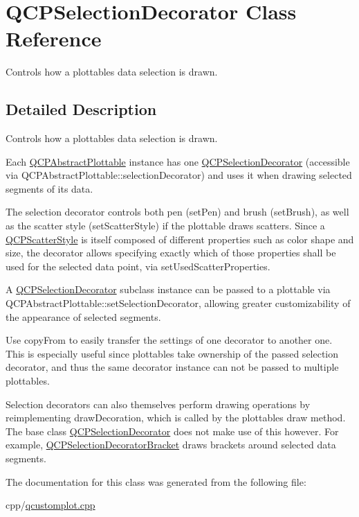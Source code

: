 \hypertarget{class_q_c_p_selection_decorator}{}\section{Q\+C\+P\+Selection\+Decorator Class Reference}
\label{class_q_c_p_selection_decorator}


Controls how a plottable\textquotesingle{}s data selection is drawn.  




\subsection{Detailed Description}
Controls how a plottable\textquotesingle{}s data selection is drawn. 

Each \mbox{\hyperlink{class_q_c_p_abstract_plottable}{Q\+C\+P\+Abstract\+Plottable}} instance has one \mbox{\hyperlink{class_q_c_p_selection_decorator}{Q\+C\+P\+Selection\+Decorator}} (accessible via Q\+C\+P\+Abstract\+Plottable\+::selection\+Decorator) and uses it when drawing selected segments of its data.

The selection decorator controls both pen (set\+Pen) and brush (set\+Brush), as well as the scatter style (set\+Scatter\+Style) if the plottable draws scatters. Since a \mbox{\hyperlink{class_q_c_p_scatter_style}{Q\+C\+P\+Scatter\+Style}} is itself composed of different properties such as color shape and size, the decorator allows specifying exactly which of those properties shall be used for the selected data point, via set\+Used\+Scatter\+Properties.

A \mbox{\hyperlink{class_q_c_p_selection_decorator}{Q\+C\+P\+Selection\+Decorator}} subclass instance can be passed to a plottable via Q\+C\+P\+Abstract\+Plottable\+::set\+Selection\+Decorator, allowing greater customizability of the appearance of selected segments.

Use copy\+From to easily transfer the settings of one decorator to another one. This is especially useful since plottables take ownership of the passed selection decorator, and thus the same decorator instance can not be passed to multiple plottables.

Selection decorators can also themselves perform drawing operations by reimplementing draw\+Decoration, which is called by the plottable\textquotesingle{}s draw method. The base class \mbox{\hyperlink{class_q_c_p_selection_decorator}{Q\+C\+P\+Selection\+Decorator}} does not make use of this however. For example, \mbox{\hyperlink{class_q_c_p_selection_decorator_bracket}{Q\+C\+P\+Selection\+Decorator\+Bracket}} draws brackets around selected data segments. 

The documentation for this class was generated from the following file\+:\begin{DoxyCompactItemize}
\item 
cpp/\mbox{\hyperlink{qcustomplot_8cpp}{qcustomplot.\+cpp}}\end{DoxyCompactItemize}
